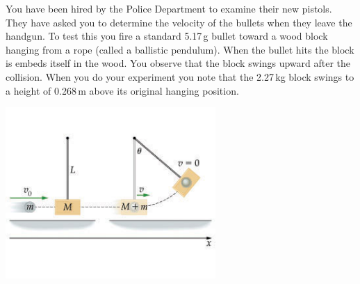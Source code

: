 \documentclass[letterpaper,addpoints,answers]{exam}
\begin{document}
\begin{questions}
\pagebreak

\question
You have been hired by the Police Department to examine their new pistols. They have asked you to determine the velocity of the bullets when they leave the handgun. To test this you fire a standard 5.17\,g bullet toward a wood block hanging from a rope (called a ballistic pendulum). When the bullet hits the block is embeds itself in the wood. You observe that the block swings upward after the collision. When you do your experiment you note that the 2.27\,kg block swings to a height of 0.268\,m above its original hanging position.

\begin{center}
 \includegraphics[width=0.6\textwidth]{ballistic_pendulum}
\end{center}


\pagebreak


\end{questions}
\end{document}
